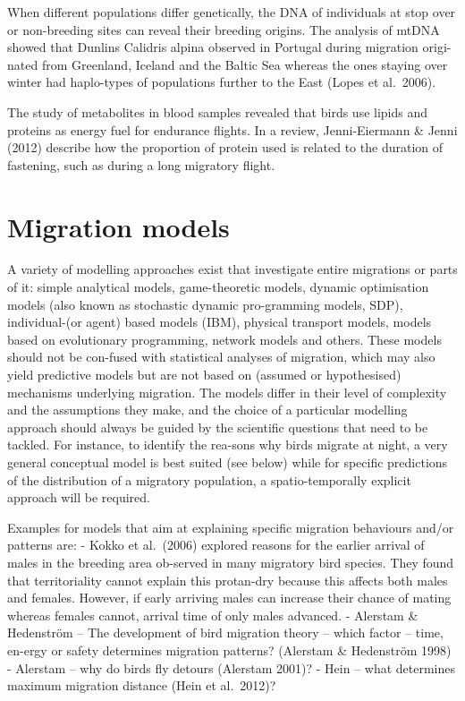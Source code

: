 \documentclass[
]{book}
\begin{document}
When different populations differ genetically, the DNA of individuals at stop over or non-breeding sites can reveal their breeding origins.
The analysis of mtDNA showed that Dunlins Calidris alpina observed in Portugal during migration origi-nated from Greenland, Iceland and the Baltic Sea whereas the ones staying over winter had haplo-types of populations further to the East (Lopes et al.~2006).

The study of metabolites in blood samples revealed that birds use lipids and proteins as energy fuel for endurance flights. In a review, Jenni-Eiermann \& Jenni (2012) describe how the proportion of protein used is related to the duration of fastening, such as during a long migratory flight.

\hypertarget{migration-models}{%
\chapter{Migration models}\label{migration-models}}

A variety of modelling approaches exist that investigate entire migrations or parts of it: simple analytical models, game-theoretic models, dynamic optimisation models (also known as stochastic dynamic pro-gramming models, SDP), individual-(or agent) based models (IBM), physical transport models, models based on evolutionary programming, network models and others. These models should not be con-fused with statistical analyses of migration, which may also yield predictive models but are not based on (assumed or hypothesised) mechanisms underlying migration. The models differ in their level of complexity and the assumptions they make, and the choice of a particular modelling approach should always be guided by the scientific questions that need to be tackled. For instance, to identify the rea-sons why birds migrate at night, a very general conceptual model is best suited (see below) while for specific predictions of the distribution of a migratory population, a spatio-temporally explicit approach will be required.

Examples for models that aim at explaining specific migration behaviours and/or patterns are:
- Kokko et al.~(2006) explored reasons for the earlier arrival of males in the breeding area ob-served in many migratory bird species. They found that territoriality cannot explain this protan-dry because this affects both males and females. However, if early arriving males can increase their chance of mating whereas females cannot, arrival time of only males advanced.
- Alerstam \& Hedenström -- The development of bird migration theory -- which factor -- time, en-ergy or safety determines migration patterns? (Alerstam \& Hedenström 1998)
- Alerstam -- why do birds fly detours (Alerstam 2001)?
- Hein -- what determines maximum migration distance (Hein et al.~2012)?
\end{document}
